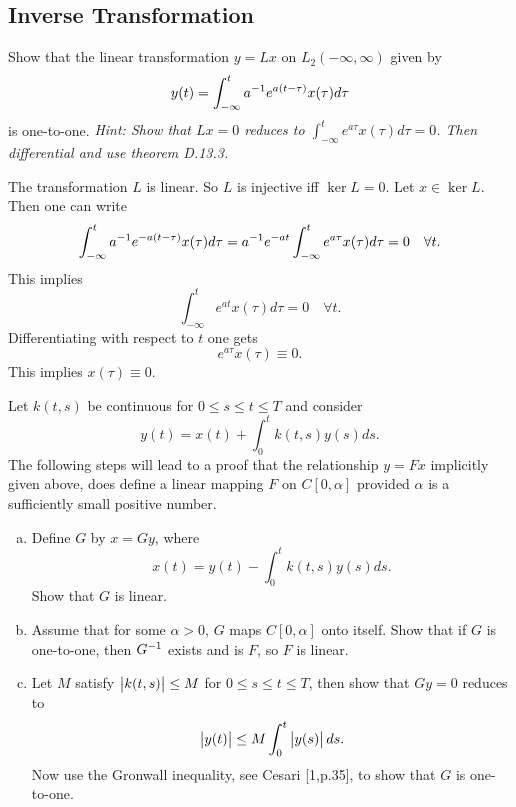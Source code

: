 \subsection{Inverse Transformation}
\begin{problem}
	Show that the linear transformation $ y = Lx $ on $ L_2(-\infty,\infty) $ given by
	\[ y(t) = \int_{-\infty}^{t}a^{-1}e^{a(t-\tau)}x(\tau) d\tau \]
	is one-to-one. \emph{Hint: Show that $ Lx = 0 $ reduces to $ \int_{-\infty}^{t} e^{a\tau}x(\tau)d\tau = 0$. Then differential and use theorem D.13.3.}
\end{problem}
\begin{solution}
	The transformation $ L $ is linear. So $ L $ is injective iff $ \ker L = 0 $. Let $ x\in \ker L $. Then one can write
	\[ \int_{-\infty}^{t}a^{-1}e^{-a(t-\tau)}x(\tau) d\tau = a^{-1} e^{-at} \int_{-\infty}^{t}e^{a\tau}x(\tau) d\tau = 0 \quad \forall t. \]
	This implies
	\[ \int_{-\infty}^{t} e^{at}x(\tau)d\tau = 0 \quad \forall t. \]
	Differentiating with respect to $ t $ one gets
	\[ e^{a\tau}x(\tau) \equiv 0. \]
	This implies $ x(\tau) \equiv 0 $. 
\end{solution}

\begin{problem}
	Let $ k(t,s) $ be continuous for $ 0\leq s\leq t \leq T $ and consider 
	\[ y(t) = x(t) + \int_{0}^{t} k(t,s)y(s)ds. \]
	The following steps will lead to a proof that the relationship $ y=Fx $ implicitly given above, does define a linear mapping $ F $ on $ C[0,\alpha] $ provided $ \alpha $ is a sufficiently small positive number. 
	\begin{enumerate}[(a)]
		\item Define $ G $ by $ x=Gy $, where
		\[ x(t) = y(t) - \int_{0}^{t}k(t,s) y(s) ds. \]
		Show that $ G $ is linear.
		
		\item Assume that for some $ \alpha > 0 $, $ G $ maps $ C[0,\alpha] $ onto itself. Show that if $ G $ is one-to-one, then $ G^{-1} $ exists and is $ F $, so $ F $ is linear.
		
		\item Let $ M $ satisfy $ \left|k(t,s)\right|\leq M $ for $ 0\leq s\leq t \leq T $, then show that $ Gy = 0 $ reduces to 
		\[ \left|y(t)\right| \leq M \int_{0}^{t} \left|y(s)\right|ds. \]
		Now use the Gronwall inequality, see Cesari [1,p.35], to show that $ G $ is one-to-one.
	\end{enumerate}
\end{problem}

